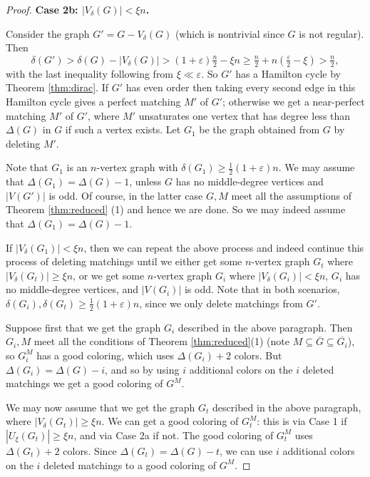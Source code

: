 \documentclass[11pt, oneside]{article}
\begin{document}
\begin{proof}
\noindent \textbf{Case 2b: $|V_\delta(G)| < \xi n$.}

Consider the graph $G'=G-V_\delta(G)$ (which is nontrivial since $G$ is not regular). Then 
$$\delta(G')> \delta(G)- |V_\delta(G)| > (1+\varepsilon) \tfrac{n}{2} -\xi n \geq \tfrac{n}{2} + n(\tfrac{\varepsilon}{2}-\xi)>\tfrac{n}{2},$$
with the last inequality following from $\xi \ll \varepsilon$.
So $G'$ has a Hamilton cycle by Theorem \ref{thm:dirac}. If $G'$ has even order then taking every second edge in this Hamilton cycle gives a perfect matching $M'$ of $G'$; otherwise we get a near-perfect matching $M'$ of $G'$, where $M'$ unsaturates one vertex that has  degree less than $\Delta(G)$ in $G$ if such a vertex exists.
Let $G_1$ be the graph obtained from $G$ by deleting $M'$.

Note that $G_1$ is an $n$-vertex graph with $\delta(G_1)\ge \frac{1}{2}(1+\varepsilon)n$. We may assume that $\Delta(G_1)=\Delta(G)-1$, unless $G$ has no middle-degree vertices and $|V(G')|$ is odd. Of course, in the latter case $G, M$ meet all the assumptions of Theorem \ref{thm:reduced} (1) and hence we are done. So we may indeed assume that $\Delta(G_1)=\Delta(G)-1$. 

If $|V_\delta(G_1)| < \xi n$, then we can repeat the above process and indeed continue this process of deleting matchings until we either get some $n$-vertex graph $G_t$ where $|V_\delta(G_t)|\geq \xi n$, or we get some $n$-vertex graph $G_i$ where $|V_\delta(G_i)| < \xi n$, $G_i$ has no middle-degree vertices, and $|V(G_i)|$ is odd. Note that in both scenarios, $\delta(G_i), \delta(G_t)\geq \frac{1}{2}(1+\varepsilon)n$, since we only delete matchings from $G'$.

Suppose first that we get the graph $G_i$ described in the above paragraph. Then $G_i, M$ meet all the conditions of Theorem \ref{thm:reduced}(1) (note $M\subseteq \overline{G}\subseteq \overline{G_i}$), so $G_i^M$ has a good coloring, which uses $\Delta(G_i)+2$ colors. But $\Delta(G_i)=\Delta(G)-i$, and so by using $i$ additional colors on the $i$ deleted matchings we get a good coloring of $G^M$. 

We may now assume that we get the graph $G_t$ described in the above paragraph, where $|V_\delta(G_t)|\geq \xi n$. We can get a good coloring of $G_t^M$: this is via Case 1 if $|U_\xi(G_t)|\geq \xi n$, and via Case 2a if not. The good coloring of $G_t^M$ uses $\Delta(G_t)+2$ colors.  Since $\Delta(G_t)=\Delta(G)-t$, we can use $i$ additional colors on the $i$ deleted matchings to a good coloring of $G^M$. 
\end{proof}
\end{document}
